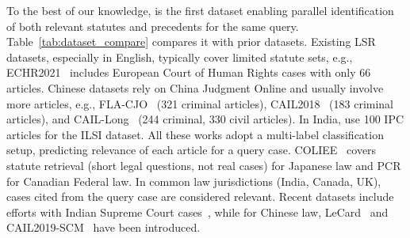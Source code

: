 To the best of our knowledge, \ilpcsr{} is the first dataset enabling parallel identification of both relevant statutes and precedents for the same query. Table~\ref{tab:dataset_compare} compares it with prior datasets. Existing LSR datasets, especially in English, typically cover limited statute sets, e.g., ECHR2021~\citep{chalkidis2021echr} includes European Court of Human Rights cases with only 66 articles. Chinese datasets rely on China Judgment Online and usually involve more articles, e.g., FLA-CJO~\citep{luo2017fla} (321 criminal articles), CAIL2018~\citep{xiao2018cail2018} (183 criminal articles), and CAIL-Long~\citep{xiao2021lawformer} (244 criminal, 330 civil articles). In India, \citet{paul2022ilsi} use 100 IPC articles for the ILSI dataset. All these works adopt a multi-label classification setup, predicting relevance of each article for a query case. COLIEE~\citep{li2024coliee2024} covers statute retrieval (short legal questions, not real cases) for Japanese law and PCR for Canadian Federal law. In common law jurisdictions (India, Canada, UK), cases cited from the query case are considered relevant. Recent datasets include efforts with Indian Supreme Court cases~\citep{joshi2023ucreat}, while for Chinese law, LeCard~\citep{ma2021lecard} and CAIL2019-SCM~\citep{xiao2019cail2019scm} have been introduced.

